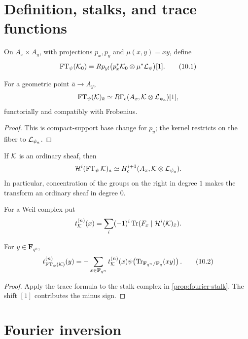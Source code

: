 \section{Definition, stalks, and trace functions}

On \(A_x\times A_y\), with projections \(p_x,p_y\) and
\(\mu(x,y)=xy\), define
\[
 \operatorname{FT}_\psi(\mathcal K_0)
 =
 Rp_{y!}\bigl(p_x^*\mathcal K_0\otimes\mu^*\mathcal L_\psi\bigr)[1].
\tag{10.1}\label{eq:fourier-definition}
\]

\begin{proposition}
\label{prop:fourier-stalk}
For a geometric point \(\bar a\to A_y\),
\[
  \operatorname{FT}_\psi(\mathcal K)_{\bar a}
  \simeq
  R\Gamma_c(A_x,\mathcal K\otimes\mathcal L_{\psi_a})[1],
\]
functorially and compatibly with Frobenius.
\end{proposition}

\begin{proof}
This is compact-support base change for \(p_y\); the kernel restricts on
the fiber to \(\mathcal L_{\psi_a}\).
\end{proof}

\begin{corollary}
\label{cor:fourier-cohomology-sheaves}
If \(\mathcal K\) is an ordinary sheaf, then
\[
 \mathcal H^i(\operatorname{FT}_\psi\mathcal K)_{\bar a}
 \simeq H_c^{i+1}(A_x,\mathcal K\otimes\mathcal L_{\psi_a}).
\]
In particular, concentration of the groups on the right in degree \(1\)
makes the transform an ordinary sheaf in degree \(0\).
\end{corollary}

For a Weil complex put
\[
 t_{\mathcal K}^{(n)}(x)
 =\sum_i(-1)^i
 \operatorname{Tr}(F_x\mid\mathcal H^i(\mathcal K)_{\bar x}).
\]

\begin{proposition}
\label{prop:fourier-trace-function}
For \(y\in\mathbf F_{q^n}\),
\[
 t_{\operatorname{FT}_\psi(\mathcal K)}^{(n)}(y)
 =
 -\sum_{x\in\mathbf F_{q^n}}
 t_{\mathcal K}^{(n)}(x)
 \psi\!\left(\operatorname{Tr}_{\mathbf F_{q^n}/\mathbf F_q}(xy)\right).
\tag{10.2}\label{eq:finite-fourier-trace}
\]
\end{proposition}

\begin{proof}
Apply the trace formula to the stalk complex in
\cref{prop:fourier-stalk}.  The shift \([1]\) contributes the minus
sign.
\end{proof}

\section{Fourier inversion}


